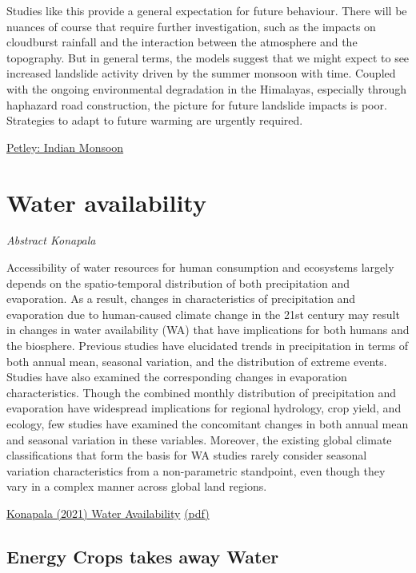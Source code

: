 \documentclass[
]{book}
\begin{document}
Studies like this provide a general expectation for future behaviour. There will be nuances of course that require further investigation, such as the impacts on cloudburst rainfall and the interaction between the atmosphere and the topography. But in general terms, the models suggest that we might expect to see increased landslide activity driven by the summer monsoon with time. Coupled with the ongoing environmental degradation in the Himalayas, especially through haphazard road construction, the picture for future landslide impacts is poor. Strategies to adapt to future warming are urgently required.

\href{https://blogs.agu.org/landslideblog/2021/04/15/future-warming-1/}{Petley: Indian Monsoon}

\hypertarget{water-availability}{%
\section{Water availability}\label{water-availability}}

\emph{Abstract Konapala}

Accessibility of water resources for human consumption and ecosystems largely depends on the spatio-temporal distribution of both precipitation and evaporation.
As a result, changes in characteristics of precipitation and evaporation due to human-caused climate change in the 21st century may result in changes in water availability (WA) that have implications for both humans and the biosphere.
Previous studies have elucidated trends in precipitation in terms of both annual mean, seasonal variation, and the distribution of extreme events. Studies have also examined the corresponding changes in evaporation characteristics.
Though the combined monthly distribution of precipitation and evaporation have widespread implications for regional hydrology, crop yield, and ecology, few studies have examined the concomitant changes in both annual mean and seasonal variation in these variables.
Moreover, the existing global climate classifications that form the basis for WA studies rarely consider seasonal variation characteristics from a non-parametric standpoint, even though they vary in a complex manner across global land regions.

\href{https://www.nature.com/articles/s41467-020-16757-w}{Konapala (2021) Water Availability}
\href{pdf/Konapala_2021_Water_Availability.pdf}{(pdf)}

\hypertarget{energy-crops-takes-away-water}{%
\subsection{Energy Crops takes away Water}\label{energy-crops-takes-away-water}}
\end{document}
